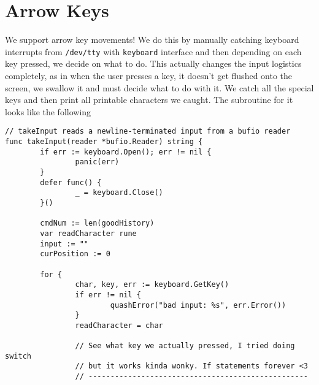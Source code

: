 \documentclass[12pt]{article}
\begin{document}
\section{Arrow Keys}
\label{sec:org2b245c8}
We support arrow key movements! We do this by manually catching keyboard
interrupts from \texttt{/dev/tty} with \texttt{keyboard} interface and then depending on each
key pressed, we decide on what to do. This actually changes the input
logistics completely, as in when the user presses a key, it doesn't get
flushed onto the screen, we swallow it and must decide what to do with it. We
catch all the special keys and then print all printable characters we
caught. The subroutine for it looks like the following
\begin{verbatim}
// takeInput reads a newline-terminated input from a bufio reader
func takeInput(reader *bufio.Reader) string {
        if err := keyboard.Open(); err != nil {
                panic(err)
        }
        defer func() {
                _ = keyboard.Close()
        }()

        cmdNum := len(goodHistory)
        var readCharacter rune
        input := ""
        curPosition := 0

        for {
                char, key, err := keyboard.GetKey()
                if err != nil {
                        quashError("bad input: %s", err.Error())
                }
                readCharacter = char

                // See what key we actually pressed, I tried doing switch
                // but it works kinda wonky. If statements forever <3
                // --------------------------------------------------


\end{verbatim}
\end{document}
